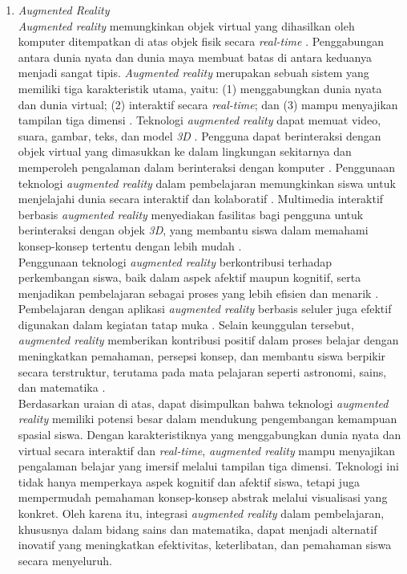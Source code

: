 \documentclass[12pt]{article}
\begin{document}
\begin{enumerate}
    \item \textit{Augmented Reality}\\
    \hspace*{1cm}\textit{Augmented reality} memungkinkan objek virtual yang dihasilkan oleh komputer ditempatkan di atas objek fisik secara \textit{real-time} \citep{ozdemir2018}. Penggabungan antara dunia nyata dan dunia maya membuat batas di antara keduanya menjadi sangat tipis. \textit{Augmented reality} merupakan sebuah sistem yang memiliki tiga karakteristik utama, yaitu: (1) menggabungkan dunia nyata dan dunia virtual; (2) interaktif secara \textit{real-time}; dan (3) mampu menyajikan tampilan tiga dimensi \citep{azuma1997}. Teknologi \textit{augmented reality} dapat memuat video, suara, gambar, teks, dan model \textit{3D} \citep{tekedere2016}. Pengguna dapat berinteraksi dengan objek virtual yang dimasukkan ke dalam lingkungan sekitarnya dan memperoleh pengalaman dalam berinteraksi dengan komputer \citep{cai2014}. Penggunaan teknologi \textit{augmented reality} dalam pembelajaran memungkinkan siswa untuk menjelajahi dunia secara interaktif dan kolaboratif \citep{antonioli2014}. Multimedia interaktif berbasis \textit{augmented reality} menyediakan fasilitas bagi pengguna untuk berinteraksi dengan objek \textit{3D}, yang membantu siswa dalam memahami konsep-konsep tertentu dengan lebih mudah \citep{martin2010}.\\
    \hspace*{1cm}Penggunaan teknologi \textit{augmented reality} berkontribusi terhadap perkembangan siswa, baik dalam aspek afektif maupun kognitif, serta menjadikan pembelajaran sebagai proses yang lebih efisien dan menarik \citep{tomi2013}. Pembelajaran dengan aplikasi \textit{augmented reality} berbasis seluler juga efektif digunakan dalam kegiatan tatap muka \citep{lin2013}. Selain keunggulan tersebut, \textit{augmented reality} memberikan kontribusi positif dalam proses belajar dengan meningkatkan pemahaman, persepsi konsep, dan membantu siswa berpikir secara terstruktur, terutama pada mata pelajaran seperti astronomi, sains, dan matematika \citep{bujak2013}.\\
    \hspace*{1cm}Berdasarkan uraian di atas, dapat disimpulkan bahwa teknologi \textit{augmented reality} memiliki potensi besar dalam mendukung pengembangan kemampuan spasial siswa. Dengan karakteristiknya yang menggabungkan dunia nyata dan virtual secara interaktif dan \textit{real-time}, \textit{augmented reality} mampu menyajikan pengalaman belajar yang imersif melalui tampilan tiga dimensi. Teknologi ini tidak hanya memperkaya aspek kognitif dan afektif siswa, tetapi juga mempermudah pemahaman konsep-konsep abstrak melalui visualisasi yang konkret. Oleh karena itu, integrasi \textit{augmented reality} dalam pembelajaran, khususnya dalam bidang sains dan matematika, dapat menjadi alternatif inovatif yang meningkatkan efektivitas, keterlibatan, dan pemahaman siswa secara menyeluruh.


\end{enumerate}
\end{document}
